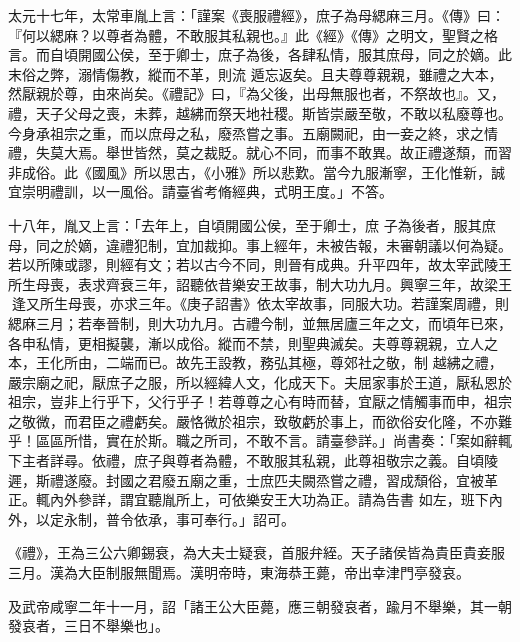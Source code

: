 \begin{pinyinscope}
 太元十七年，太常車胤上言：「謹案《喪服禮經》，庶子為母緦麻三月。《傳》曰：『何以緦麻？以尊者為體，不敢服其私親也。』此《經》《傳》之明文，聖賢之格言。而自頃開國公侯，至于卿士，庶子為後，各肆私情，服其庶母，同之於嫡。此末俗之弊，溺情傷教，縱而不革，則流
 遁忘返矣。且夫尊尊親親，雖禮之大本，然厭親於尊，由來尚矣。《禮記》曰，『為父後，出母無服也者，不祭故也』。又，禮，天子父母之喪，未葬，越紼而祭天地社稷。斯皆崇嚴至敬，不敢以私廢尊也。今身承祖宗之重，而以庶母之私，廢烝嘗之事。五廟闕祀，由一妾之終，求之情禮，失莫大焉。舉世皆然，莫之裁貶。就心不同，而事不敢異。故正禮遂頹，而習非成俗。此《國風》所以思古，《小雅》所以悲歎。當今九服漸寧，王化惟新，誠宜崇明禮訓，以一風俗。請臺省考脩經典，式明王度。」不答。



 十八年，胤又上言：「去年上，自頃開國公侯，至于卿士，庶
 子為後者，服其庶母，同之於嫡，違禮犯制，宜加裁抑。事上經年，未被告報，未審朝議以何為疑。若以所陳或謬，則經有文；若以古今不同，則晉有成典。升平四年，故太宰武陵王所生母喪，表求齊衰三年，詔聽依昔樂安王故事，制大功九月。興寧三年，故梁王逢又所生母喪，亦求三年。《庚子詔書》依太宰故事，同服大功。若謹案周禮，則緦麻三月；若奉晉制，則大功九月。古禮今制，並無居廬三年之文，而頃年已來，各申私情，更相擬襲，漸以成俗。縱而不禁，則聖典滅矣。夫尊尊親親，立人之本，王化所由，二端而已。故先王設教，務弘其極，尊郊社之敬，制
 越紼之禮，嚴宗廟之祀，厭庶子之服，所以經緯人文，化成天下。夫屈家事於王道，厭私恩於祖宗，豈非上行乎下，父行乎子！若尊尊之心有時而替，宜厭之情觸事而申，祖宗之敬微，而君臣之禮虧矣。嚴恪微於祖宗，致敬虧於事上，而欲俗安化隆，不亦難乎！區區所惜，實在於斯。職之所司，不敢不言。請臺參詳。」尚書奏：「案如辭輒下主者詳尋。依禮，庶子與尊者為體，不敢服其私親，此尊祖敬宗之義。自頃陵遲，斯禮遂廢。封國之君廢五廟之重，士庶匹夫闕烝嘗之禮，習成頹俗，宜被革正。輒內外參詳，謂宜聽胤所上，可依樂安王大功為正。請為告書
 如左，班下內外，以定永制，普令依承，事可奉行。」詔可。



 《禮》，王為三公六卿錫衰，為大夫士疑衰，首服弁絰。天子諸侯皆為貴臣貴妾服三月。漢為大臣制服無聞焉。漢明帝時，東海恭王薨，帝出幸津門亭發哀。



 及武帝咸寧二年十一月，詔「諸王公大臣薨，應三朝發哀者，踰月不舉樂，其一朝發哀者，三日不舉樂也」。




\end{pinyinscope}
